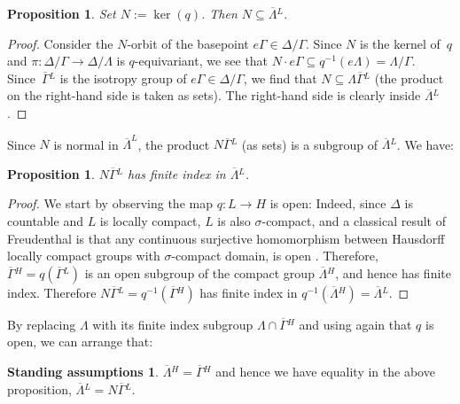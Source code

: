 \documentclass[JEP,XML,SOM,Unicode,published]{cedram}
\newcommand{\oGL}{\ensuremath{\overline{\Gamma}{}^L}}
\newcommand{\oGH}{\ensuremath{\overline{\Gamma}{}^H}}
\newcommand{\oLL}{\ensuremath{\overline{\Lambda}{}^L}}
\newcommand{\oLH}{\ensuremath{\overline{\Lambda}{}^H}}
\newtheorem{prop}[thm]{Proposition}
\theoremstyle{definition}
\newtheorem{assume}[thm]{Standing assumptions}
\begin{document}
\begin{prop}\label{prop:NinGamma}
Set $N:=\ker(q)$. Then $N\subseteq \oLL$.
\end{prop}
\begin{proof} Consider the $N$-orbit of the basepoint $e\Gamma\in \Delta / \Gamma$. Since $N$ is the kernel of~$q$ and $\pi:\Delta/\Gamma\to\Delta/\Lambda$ is $q$-equivariant, we see that $N\cdot e\Gamma\subseteq q^{-1}(e\Lambda)=\Lambda / \Gamma$. Since~$\oGL$ is the isotropy group of $e\Gamma\in \Delta / \Gamma$, we find that $N\subseteq \Lambda \oGL$ (the product on the right-hand side is taken as sets). The right-hand side is clearly inside $\oLL$. \end{proof}
Since $N$ is normal in $\overline{\Lambda}^L$, the product $N\oGL$ (as sets) is a subgroup of $\oLL$. We have:
\begin{prop}\label{prop:propbyN}
$N\oGL$ has finite index in $\oLL$.
\end{prop}
\begin{proof} We start by observing the map $q:L\to H$ is open: Indeed, since $\Delta$ is countable and $L$ is locally compact, $L$ is also $\sigma$-compact, and a classical result of Freudenthal is that any continuous surjective homomorphism between Hausdorff locally compact groups with $\sigma$-compact domain, is open \cite[Cor.\,2.D.6]{cornulier-dlh-book}. Therefore, $\oGH=q(\oGL)$ is an open subgroup of the compact group $\oLH$, and hence has finite index. Therefore $N\oGL=q^{-1}(\oGH)$ has finite index in $q^{-1}(\oLH)=\oLL$.\end{proof}

By replacing $\Lambda$ with its finite index subgroup $\Lambda\cap\oGH$ and using again that $q$ is open, we can arrange that:

\begin{assume}\label{assume:oLH=oGH}
$\oLH=\oGH$ and hence we have equality in the above proposition, \ie $\oLL=N\oGL$.
\end{assume}
\end{document}
